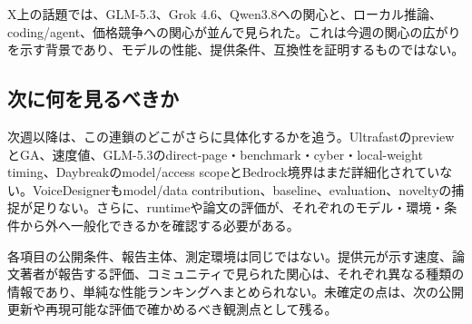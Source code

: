 \begin{communitynote}
X上の話題では、GLM-5.3、Grok 4.6、Qwen3.8への関心と、ローカル推論、coding/agent、価格競争への関心が並んで見られた。これは今週の関心の広がりを示す背景であり、モデルの性能、提供条件、互換性を証明するものではない\cite{w33-community}。
\end{communitynote}

\subsection*{次に何を見るべきか}
次週以降は、この連鎖のどこがさらに具体化するかを追う。UltrafastのpreviewとGA、速度値、GLM-5.3のdirect-page・benchmark・cyber・local-weight timing、Daybreakのmodel/access scopeとBedrock境界はまだ詳細化されていない。VoiceDesignerもmodel/data contribution、baseline、evaluation、noveltyの捕捉が足りない。さらに、runtimeや論文の評価が、それぞれのモデル・環境・条件から外へ一般化できるかを確認する必要がある。

\begin{claimboundary}[この総括の読み方]
各項目の公開条件、報告主体、測定環境は同じではない。提供元が示す速度、論文著者が報告する評価、コミュニティで見られた関心は、それぞれ異なる種類の情報であり、単純な性能ランキングへまとめられない。未確定の点は、次の公開更新や再現可能な評価で確かめるべき観測点として残る。
\end{claimboundary}
